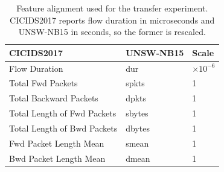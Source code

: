 \begin{table}[htbp]
\centering
\caption{Feature alignment used for the transfer experiment. CICIDS2017 reports flow duration in microseconds and UNSW-NB15 in seconds, so the former is rescaled.}
\label{tab:align}
\footnotesize
\begin{tabular}{lll}
\hline
CICIDS2017 & UNSW-NB15 & Scale \\
\hline
Flow Duration & dur & $\times 10^{-6}$ \\
Total Fwd Packets & spkts & 1 \\
Total Backward Packets & dpkts & 1 \\
Total Length of Fwd Packets & sbytes & 1 \\
Total Length of Bwd Packets & dbytes & 1 \\
Fwd Packet Length Mean & smean & 1 \\
Bwd Packet Length Mean & dmean & 1 \\
\hline
\end{tabular}
\end{table}
